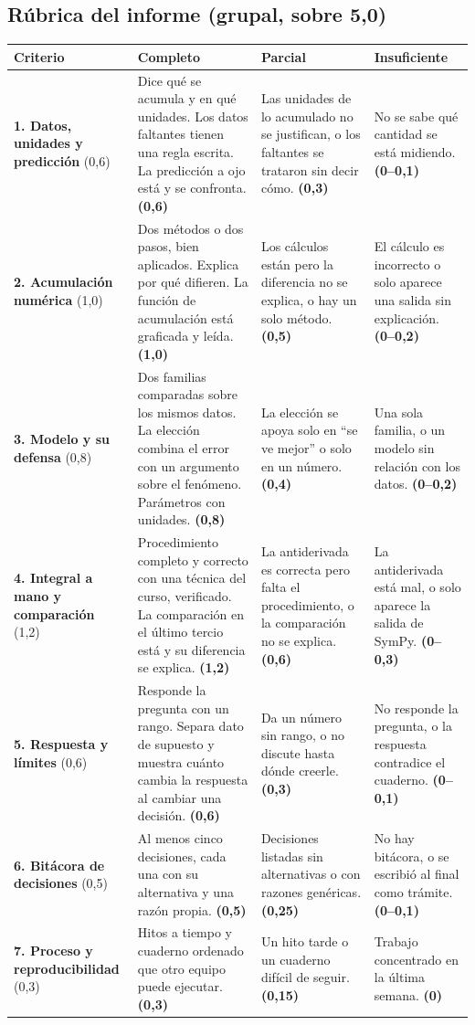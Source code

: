 \documentclass[12pt,letterpaper]{article}
\renewcommand{\arraystretch}{1.25}
\begin{document}
\subsection{Rúbrica del informe (grupal, sobre 5,0)}
\begin{center}
\footnotesize\renewcommand{\arraystretch}{1.15}
\begin{tabularx}{\textwidth}{L{3.0cm}YYY}
\toprule
\textbf{Criterio} & \textbf{Completo} & \textbf{Parcial} & \textbf{Insuficiente}\\
\midrule
\textbf{1. Datos, unidades y predicción} (0,6) & Dice qué se acumula y en qué unidades. Los datos faltantes tienen una regla escrita. La predicción a ojo está y se confronta. \textbf{(0,6)} & Las unidades de lo acumulado no se justifican, o los faltantes se trataron sin decir cómo. \textbf{(0,3)} & No se sabe qué cantidad se está midiendo. \textbf{(0--0,1)}\\
\textbf{2. Acumulación numérica} (1,0) & Dos métodos o dos pasos, bien aplicados. Explica por qué difieren. La función de acumulación está graficada y leída. \textbf{(1,0)} & Los cálculos están pero la diferencia no se explica, o hay un solo método. \textbf{(0,5)} & El cálculo es incorrecto o solo aparece una salida sin explicación. \textbf{(0--0,2)}\\
\textbf{3. Modelo y su defensa} (0,8) & Dos familias comparadas sobre los mismos datos. La elección combina el error con un argumento sobre el fenómeno. Parámetros con unidades. \textbf{(0,8)} & La elección se apoya solo en ``se ve mejor'' o solo en un número. \textbf{(0,4)} & Una sola familia, o un modelo sin relación con los datos. \textbf{(0--0,2)}\\
\textbf{4. Integral a mano y comparación} (1,2) & Procedimiento completo y correcto con una técnica del curso, verificado. La comparación en el último tercio está y su diferencia se explica. \textbf{(1,2)} & La antiderivada es correcta pero falta el procedimiento, o la comparación no se explica. \textbf{(0,6)} & La antiderivada está mal, o solo aparece la salida de SymPy. \textbf{(0--0,3)}\\
\textbf{5. Respuesta y límites} (0,6) & Responde la pregunta con un rango. Separa dato de supuesto y muestra cuánto cambia la respuesta al cambiar una decisión. \textbf{(0,6)} & Da un número sin rango, o no discute hasta dónde creerle. \textbf{(0,3)} & No responde la pregunta, o la respuesta contradice el cuaderno. \textbf{(0--0,1)}\\
\textbf{6. Bitácora de decisiones} (0,5) & Al menos cinco decisiones, cada una con su alternativa y una razón propia. \textbf{(0,5)} & Decisiones listadas sin alternativas o con razones genéricas. \textbf{(0,25)} & No hay bitácora, o se escribió al final como trámite. \textbf{(0--0,1)}\\
\textbf{7. Proceso y reproducibilidad} (0,3) & Hitos a tiempo y cuaderno ordenado que otro equipo puede ejecutar. \textbf{(0,3)} & Un hito tarde o un cuaderno difícil de seguir. \textbf{(0,15)} & Trabajo concentrado en la última semana. \textbf{(0)}\\
\bottomrule
\end{tabularx}
\end{center}
\end{document}
